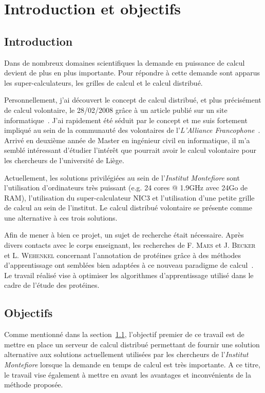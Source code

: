 \documentclass[a4paper, 11pt]{report}
\begin{document}
\newpage
\tableofcontents
\newpage

\chapter{Introduction et objectifs}

\section{Introduction}
\label{intro}
Dans de nombreux domaines scientifiques la demande en puissance de calcul devient de plus en plus importante. Pour répondre à cette demande sont apparus les super-calculateurs, les grilles de calcul et le calcul distribué.

Personnellement, j'ai découvert le concept de calcul distribué, et plus précisément de calcul volontaire, le 28/02/2008 grâce à un article publié sur un site informatique~\cite{MACG}. J'ai rapidement été séduit par le concept et me suis fortement impliqué au sein de la communauté des volontaires de l'\textit{L'Alliance Francophone}~\cite{AF}. Arrivé en deuxième année de Master en ingénieur civil en informatique, il m'a semblé intéressant d'étudier l'intérêt que pourrait avoir le calcul volontaire pour les chercheurs de l'université de Liège. 

Actuellement, les solutions privilégiées au sein de l'\textit{Institut Montefiore} sont l'utilisation d'ordinateurs très puissant (e.g. 24 cores @ 1.9GHz avec 24Go de RAM), l'utilisation du super-calculateur NIC3 et l'utilisation d'une petite grille de calcul au sein de l'institut. Le calcul distribué volontaire se présente comme une alternative à ces trois solutions.

Afin de mener à bien ce projet, un sujet de recherche était nécessaire. Après divers contacts avec le corps enseignant, les recherches de F. \textsc{Maes} et J. \textsc{Becker} et L. \textsc{Wehenkel} concernant l'annotation de protéines grâce à des méthodes d'apprentissage ont semblées bien adaptées à ce nouveau paradigme de calcul~\cite{POSTER}\cite{CAP}. Le travail réalisé vise à optimiser les algorithmes d'apprentissage utilisé dans le cadre de l'étude des protéines.

\section{Objectifs}
\label{objectifs}
Comme mentionné dans la section~\ref{intro}, l'objectif premier de ce travail est de mettre en place un serveur de calcul distribué permettant de fournir une solution alternative aux solutions actuellement utilisées par les chercheurs de l'\textit{Institut Montefiore} lorsque la demande en temps de calcul est très importante. A ce titre, le travail vise également à mettre en avant les avantages et inconvénients de la méthode proposée.
\end{document}
